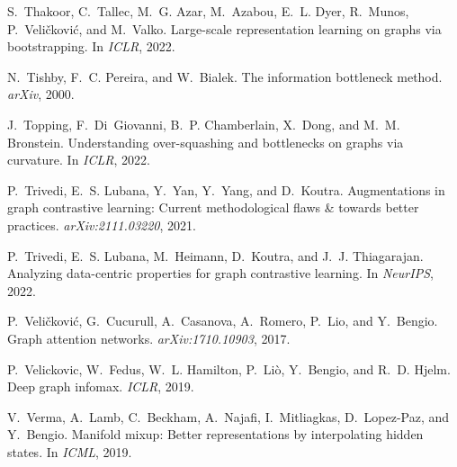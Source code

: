 \documentclass[11pt]{article}
\begin{document}
\begin{thebibliography}{10}
\begin{small}
S.~Thakoor, C.~Tallec, M.~G. Azar, M.~Azabou, E.~L. Dyer, R.~Munos,
  P.~Veli{\v{c}}kovi{\'c}, and M.~Valko.
\newblock Large-scale representation learning on graphs via bootstrapping.
\newblock In \emph{ICLR}, 2022.

N.~Tishby, F.~C. Pereira, and W.~Bialek.
\newblock The information bottleneck method.
\newblock \emph{arXiv}, 2000.

J.~Topping, F.~Di~Giovanni, B.~P. Chamberlain, X.~Dong, and M.~M. Bronstein.
\newblock Understanding over-squashing and bottlenecks on graphs via curvature.
\newblock In \emph{ICLR}, 2022.

P.~Trivedi, E.~S. Lubana, Y.~Yan, Y.~Yang, and D.~Koutra.
\newblock Augmentations in graph contrastive learning: Current methodological
  flaws \& towards better practices.
\newblock \emph{arXiv:2111.03220}, 2021.

P.~Trivedi, E.~S. Lubana, M.~Heimann, D.~Koutra, and J.~J. Thiagarajan.
\newblock Analyzing data-centric properties for graph contrastive learning.
\newblock In \emph{NeurIPS}, 2022.

P.~Veli{\v{c}}kovi{\'c}, G.~Cucurull, A.~Casanova, A.~Romero, P.~Lio, and
  Y.~Bengio.
\newblock Graph attention networks.
\newblock \emph{arXiv:1710.10903}, 2017.

P.~Velickovic, W.~Fedus, W.~L. Hamilton, P.~Li{\`o}, Y.~Bengio, and R.~D.
  Hjelm.
\newblock Deep graph infomax.
\newblock \emph{ICLR}, 2019.

V.~Verma, A.~Lamb, C.~Beckham, A.~Najafi, I.~Mitliagkas, D.~Lopez-Paz, and
  Y.~Bengio.
\newblock Manifold mixup: Better representations by interpolating hidden
  states.
\newblock In \emph{ICML}, 2019{}.


\end{small}
\end{thebibliography}
\end{document}
